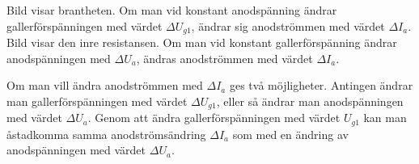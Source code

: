 Bild  visar brantheten.
Om man vid konstant anodspänning ändrar gallerförspänningen med värdet
\(\Delta U_{g1}\), ändrar sig anodströmmen med värdet \(\Delta I_a\).
\noindent%
Bild  visar den inre resistansen.
Om man vid konstant gallerförspänning ändrar anodspänningen med
\(\Delta U_a\), ändras anodströmmen med värdet \(\Delta I_a\).
\noindent%

\noindent
Om man vill ändra anodströmmen med \(\Delta I_a\) ges två möjligheter.
Antingen ändrar man gallerförspänningen med värdet \(\Delta U_{g1}\), eller så
ändrar man anodspänningen med värdet \(\Delta U_a\).
Genom att ändra gallerförspänningen med värdet \(U_{g1}\) kan man åstadkomma
samma anodströmsändring \(\Delta I_a\) som med en ändring av anodspänningen
med värdet \(\Delta U_a\).

